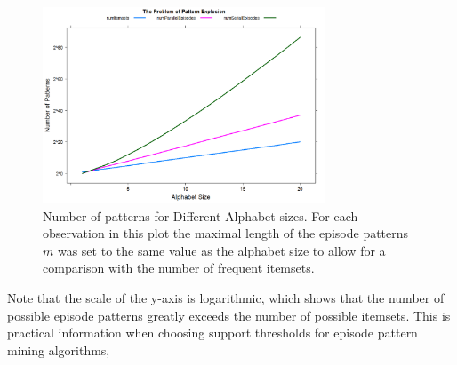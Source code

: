 \begin{figure}[h]
	\centering
  	\includegraphics[width=0.75\textwidth]{patternExplosion}
	\caption{Number of patterns for Different Alphabet sizes. For each observation in this plot the maximal length of the episode patterns $m$ was set to the same value as the alphabet size to allow for a comparison with the number of frequent itemsets.}
	\label{fig_patternExplosion}
\end{figure}

Note that the scale of the y-axis is logarithmic, which shows that the number of possible episode patterns greatly exceeds the number of possible itemsets. This is practical information when choosing support thresholds for episode pattern mining algorithms, 